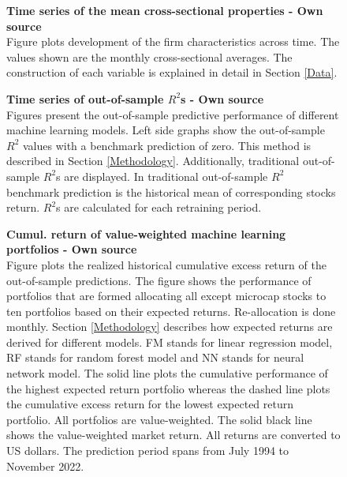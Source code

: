 \documentclass[12pt]{article}
\begin{document}
\begin{appendices}
\begin{figure}[H]
\centering
\caption[Time series of the mean cross-sectional properties]{\textbf{Time series of the mean cross-sectional properties \textnormal{- Own source}}\\ Figure plots development of the firm characteristics across time. The values shown are the monthly cross-sectional averages. The construction of each variable is explained in detail in Section \ref{Data}.}

\label{plot:variableTS}
\end{figure}

\begin{figure}[H]
\centering
\caption[Time series of out-of-sample $R^2$]{\textbf{Time series of out-of-sample \boldmath$R^2$s \textnormal{- Own source}}\\ Figures present the out-of-sample predictive performance of different machine learning models. Left side graphs show the out-of-sample $R^2$ values with a benchmark prediction of zero. This method is described in Section \ref{Methodology}. Additionally, traditional out-of-sample $R^2$s are displayed. In traditional out-of-sample $R^2$ benchmark prediction is the historical mean of corresponding stocks return. $R^2$s are calculated for each retraining period.}

\label{plot:OOSR2_ts}
\end{figure}

\begin{figure}[H]
\centering
\caption[Cumulative return of value-weighted machine learning portfolios]{\textbf{Cumul. return of value-weighted machine learning portfolios \textnormal{- Own source}}\\ Figure plots the realized historical cumulative excess return of the out-of-sample predictions. The figure shows the performance of portfolios that are formed allocating all except microcap stocks to ten portfolios based on their expected returns. Re-allocation is done monthly. Section \ref{Methodology} describes how expected returns are derived for different models. FM stands for linear regression model, RF stands for random forest model and NN stands for neural network model. The solid line plots the cumulative performance of the highest expected return portfolio whereas the dashed line plots the cumulative excess return for the lowest expected return portfolio. All portfolios are value-weighted. The solid black line shows the value-weighted market return. All returns are converted to US dollars. The prediction period spans from July 1994 to November 2022.}

\label{plot:cumul_vw_portf_return}
\end{figure}


\end{appendices}
\end{document}
